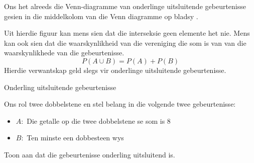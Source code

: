 Ons het alreeds die Venn-diagramme van onderlinge uitsluitende gebeurtenisse gesien in die middelkolom van die Venn diagramme op bladsy \pageref{fig:venn_union_intersection}.

\begin{figure}[H]
  
\end{figure}

Uit hierdie figuur kan mens sien dat die interseksie geen elemente het nie. Mens kan ook sien dat die waarskynlikheid van die vereniging die som is van van die waarskynlikhede van die gebeurtenisse.
\[P(A \cup B) = P(A) + P(B)\]
Hierdie verwantskap geld slegs vir onderlinge uitsluitende gebeurtenisse.
\clearpage
\begin{wex}{Onderling uitsluitende gebeurtenisse}{
\begin{minipage}{\textwidth}
  Ons rol twee dobbelstene en stel belang in die volgende twee gebeurtenisse:
  \begin{itemize}
  \item[] $A:$ Die getalle op die twee dobbelstene se som is $8$
  \item[] $B:$ Ten minste een dobbesteen wys 
  \end{itemize}
  Toon aan dat die gebeurtenisse onderling uitsluitend is.
\end{minipage}
}{

}
\end{wex}
